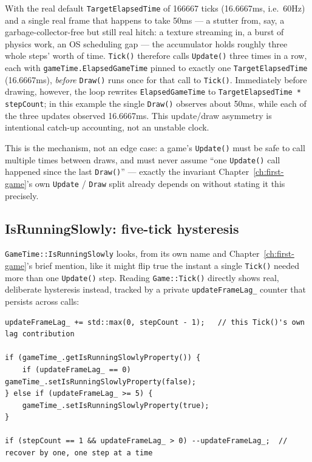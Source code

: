 With the real default \texttt{TargetElapsedTime} of 166667 ticks (16.6667ms, i.e.\ 60Hz) and a
single real frame that happens to take 50ms --- a stutter from, say, a garbage-collector-free but
still real hitch: a texture streaming in, a burst of physics work, an OS scheduling gap --- the
accumulator holds roughly three whole steps' worth of time. \texttt{Tick()} therefore calls
\texttt{Update()} three times in a row, each with \texttt{gameTime.ElapsedGameTime} pinned to
exactly one \texttt{TargetElapsedTime} (16.6667ms), \emph{before} \texttt{Draw()} runs once for
that call to \texttt{Tick()}. Immediately before drawing, however, the loop rewrites
\texttt{ElapsedGameTime} to \texttt{TargetElapsedTime * stepCount}; in this example the single
\texttt{Draw()} observes about 50ms, while each of the three updates observed 16.6667ms. This
update/draw asymmetry is intentional catch-up accounting, not an unstable clock.

This is the mechanism, not an edge case: a game's \texttt{Update()}
must be safe to call multiple times between draws, and must never assume ``one \texttt{Update()}
call happened since the last \texttt{Draw()}'' --- exactly the invariant
Chapter~\ref{ch:first-game}'s own \texttt{Update} / \texttt{Draw} split already depends on
without stating it this precisely.

\subsection{IsRunningSlowly: five-tick hysteresis}

\texttt{GameTime::IsRunningSlowly} looks, from its own name and Chapter~\ref{ch:first-game}'s
brief mention, like it might flip true the instant a single \texttt{Tick()} needed more than one
\texttt{Update()} step. Reading \texttt{Game::Tick()} directly shows real, deliberate hysteresis
instead, tracked by a private \texttt{updateFrameLag\_} counter that persists across calls:

\begin{lstlisting}
updateFrameLag_ += std::max(0, stepCount - 1);   // this Tick()'s own lag contribution

if (gameTime_.getIsRunningSlowlyProperty()) {
    if (updateFrameLag_ == 0) gameTime_.setIsRunningSlowlyProperty(false);
} else if (updateFrameLag_ >= 5) {
    gameTime_.setIsRunningSlowlyProperty(true);
}

if (stepCount == 1 && updateFrameLag_ > 0) --updateFrameLag_;  // recover by one, one step at a time
\end{lstlisting}

